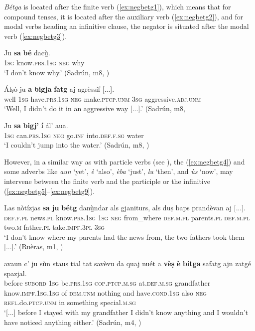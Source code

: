 \textit{Bétga} is located after the finite verb (\ref{ex:negbetg1}), which means that for compound tenses, it is located after the auxiliary verb (\ref{ex:negbetg2}), and for modal verbs heading an infinitive clause, the negator is situated after the modal verb (\ref{ex:negbetg3}). 

\ea
\label{ex:negbetg1}
\gll Ju \textbf{sa} \textbf{bé} dacù̱.\\
\textsc{1sg} know.\textsc{prs.1sg} \textsc{neg} why \\
\glt `I don’t know why.' (Sadrún, m8, )
\z

\ea
\label{ex:negbetg2}
\gll  Álṣò ju \textbf{a} \textbf{bigja} \textbf{fatg} aj agrèssíf [...]. \\
well \textsc{1sg} have.\textsc{prs.1sg} \textsc{neg} make.\textsc{ptcp.unm} \textsc{3sg} aggressive.\textsc{adj.unm}\\
\glt `Well, I didn’t do it in an aggressive way [...].' (Sadrún, m8, 
\z

\ea\label{ex:negbetg3}
\gll  Ju \textbf{sa} \textbf{bigj’} \textbf{í} ál’ aua.\\
\textsc{1sg} can.\textsc{prs.1sg} \textsc{neg} go.\textsc{inf} into.\textsc{def.f.sg} water \\
\glt `I couldn’t jump into the water.' (Sadrún, m8, )
\z

However, in a similar way as with particle verbs (see ), the  (\ref{ex:negbetg4}) and some adverbs like \textit{aun} `yet', \textit{è} `also', \textit{èba} `just', \textit{lu} `then', and \textit{ùs} `now', may intervene between the finite verb and the participle or the infinitive (\ref{ex:negbetg5}--\ref{ex:negbetg9}).

\ea
\label{ex:negbetg4}
\gll Las nòtízjas \textbf{sa} \textbf{ju} \textbf{bétg} danù̱ndar als gjaniturs, als duṣ baps prandèvan aj [...]. \\
\textsc{def.f.pl} news.\textsc{pl} know.\textsc{prs.1sg} \textsc{1sg} \textsc{neg} from\_where \textsc{def.m.pl} parents.\textsc{pl} \textsc{def.m.pl} two.\textsc{m} father.\textsc{pl} take.\textsc{impf.3pl} \textsc{3sg}\\
\glt `I don’t know where my parents had the news from, the two fathers took them [...].' (Ruèras, m1, )
\z

\ea
\label{ex:negbetg5}
\gll  [...] avaun c’ ju sùn staus tial tat savèvu da quaj nuét a \textbf{vèṣ} \textbf{è} \textbf{bitga} safatg ajn zatgé spazjal.  \\
{} before \textsc{subord} \textsc{1sg} be.\textsc{prs.1sg} \textsc{cop.ptcp.m.sg} at.\textsc{def.m.sg} grandfather know.\textsc{impf.1sg.1sg} of \textsc{dem.unm} nothing and have.\textsc{cond.1sg} also \textsc{neg} \textsc{refl.}do.\textsc{ptcp.unm} in something special.\textsc{m.sg}\\
\glt `[...] before I stayed with my grandfather I didn’t know anything and I wouldn’t have noticed anything either.' (Sadrún, m4, )
\z

